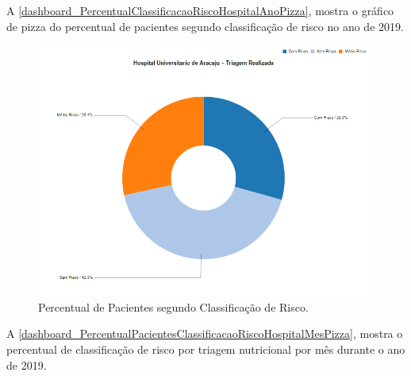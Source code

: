 \newpage
A \autoref{dashboard_PercentualClassificacaoRiscoHospitalAnoPizza}, mostra o gráfico de pizza do percentual de pacientes segundo classificação de risco no ano de 2019.

\begin{figure}[htb]
	\caption{\label{dashboard_PercentualClassificacaoRiscoHospitalAnoPizza}Percentual de Pacientes segundo Classificação de Risco.}
	\begin{center}
	    \includegraphics[scale=0.65]{Imagens/2.1.PercentualPacientesClassificacaoRiscoHospitalAnoPizza.png}
	\end{center}
\end{figure}

\clearpage
A \autoref{dashboard_PercentualPacientesClassificacaoRiscoHospitalMesPizza}, mostra o percentual de classificação de risco por triagem nutricional por mês durante o ano de 2019.

